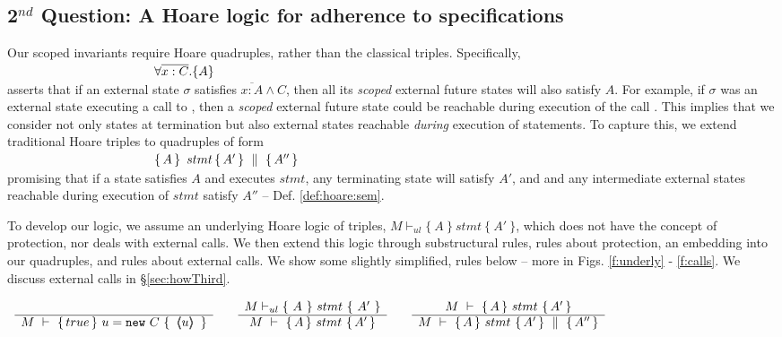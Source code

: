   
  \subsection{2$^{nd}$ Question:  A Hoare logic for adherence to specifications}  
 \label{sec:howSecond}

Our scoped invariants require Hoare   quadruples, rather than the classical triples.
Specifically, \\
  $\strut \ \hspace{4cm} {\TwoStatesN  {\overline{x:C}}  {A}}$\\
 asserts that if an external {state} $\sigma$ 
 satisfies $\overline {x:A} \wedge C$, then all its \emph{scoped} external future  states will  {also} satisfy  {$A$}. 
For example, if $\sigma$ was an external state executing a call to , then a \emph{scoped} external future  state
 could be reachable during execution of the   call .
This implies that we consider not only states at termination but also external states reachable
 \emph{during} execution of  statements. 
To  capture this, we extend   traditional Hoare triples to quadruples of  form\\
 $\strut \ \hspace{4cm} \quadruple {A} {\, stmt\, }{A'} {A''}$\\  
 promising that if a state satisfies $A$ and executes $stmt$, any terminating state will satisfy $A'$, and 
 and  any intermediate external states reachable during execution of $stmt$ satisfy    $A''$ -- \cf Def. \ref{def:hoare:sem}.
 
\vspace{.05cm}

To develop our logic, we   assume  an  underlying   Hoare logic  of  triples, 
$ M \vdash_{ul} \{ \ A\ \} {\ stmt\ }\{\ A'\ \} $,
which does not {have} the concept of protection, nor deals with external calls.
We then extend this logic through  
substructural rules,   rules about protection,  an embedding into our quadruples, and rules about external calls.
We show some  slightly simplified, rules below -- more in 
 Figs. \ref{f:underly} -  \ref{f:calls}.
 We discuss external calls in \S \ref{sec:howThird}.


{\footnotesize{
$
\begin{array}{lclcl}
\inferruleNoName 
	{ 
	 	
	}  	 
	{	 
 	\hproves  {M}  
	                {  true  }  
 			   {\  u = \prg{new}\ C \ }
 			   {\  \inside{u}\  } 
	} 
& &
\inferruleNoName 
	{
	 M \vdash_{ul} \{ \ A\ \} {\ stmt\ }\{\ A'\ \} 
	}  
	{ \hproves  {M}  {A} {\ stmt\ }{A'} }
	& &
\inferruleNoName 
	{  
	\hproves{M}  {A} {\ stmt \ } {A'} 
	}
	{\hprovesN{M}  {A} {\ stmt \ } {A'} {A''} }
\end{array}
$
}}

